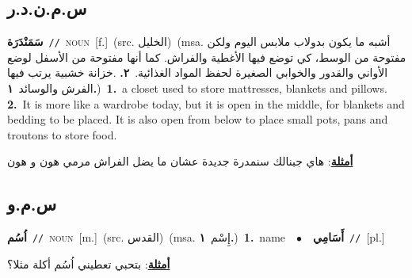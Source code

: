 \documentclass[10pt,a4paper,twoside]{article} %
\begin{document}
\begin{multicols}{2}
\vspace{-3mm}
\subsection*{\color{blue}\foreignlanguage{arabic}{س.م.ن.د.ر}\color{blue}{ (ntws)}} 

{\setlength\topsep{0pt}\textbf{\foreignlanguage{arabic}{سَمَنْدَرَة}}\ {\color{gray}\texttt{//}\color{black}}\ \textsc{noun}\ [f.]\ (src. \color{gray}\foreignlanguage{arabic}{الخليل}\color{black})\ \color{gray}(msa. \foreignlanguage{arabic}{أشبه ما يكون بدولاب ملابس اليوم ولكن مفتوحة من الوسط، كي توضع فيها الأغطية والفراش. كما أنها مفتوحة من الأسفل لوضع الأواني والقدور والخوابي الصغيرة لحفظ المواد الغذائية.}~\foreignlanguage{arabic}{\textbf{٢.}}  .\foreignlanguage{arabic}{خزانة خشبية يرتب فيها الفرش والوسائد}~\foreignlanguage{arabic}{\textbf{١.}})\color{black}\ \textbf{1.}~a closet used to store mattresses, blankets and pillows.  \textbf{2.}~It is more like a wardrobe today, but it is open in the middle, for blankets and bedding to be placed. It is also open from below to place small pots, pans and troutons to store food.\  \begin{flushright}\color{gray}\foreignlanguage{arabic}{\textbf{\underline{\foreignlanguage{arabic}{أمثلة}}}: هاي جبنالك سنمدرة جديدة عشان ما يضل الفراش مرمي هون و هون}\end{flushright}\color{black}} \vspace{2mm}

\vspace{-3mm}
\subsection*{\color{blue}\foreignlanguage{arabic}{س.م.و}\color{blue}{}} 

{\setlength\topsep{0pt}\textbf{\foreignlanguage{arabic}{اُسُم}}\ {\color{gray}\texttt{//}\color{black}}\ \textsc{noun}\ [m.]\ (src. \color{gray}\foreignlanguage{arabic}{القدس}\color{black})\ \color{gray}(msa. \foreignlanguage{arabic}{إِسْم}~\foreignlanguage{arabic}{\textbf{١.}})\color{black}\ \textbf{1.}~name\ \ $\bullet$\ \ \setlength\topsep{0pt}\textbf{\foreignlanguage{arabic}{أَسَامِي}}\ {\color{gray}\texttt{//}\color{black}}\ [pl.]\  \begin{flushright}\color{gray}\foreignlanguage{arabic}{\textbf{\underline{\foreignlanguage{arabic}{أمثلة}}}: بتحبي تعطيني اُسُم أكلة مثلا؟}\end{flushright}\color{black}} \vspace{2mm}


\end{multicols}
\end{document}
